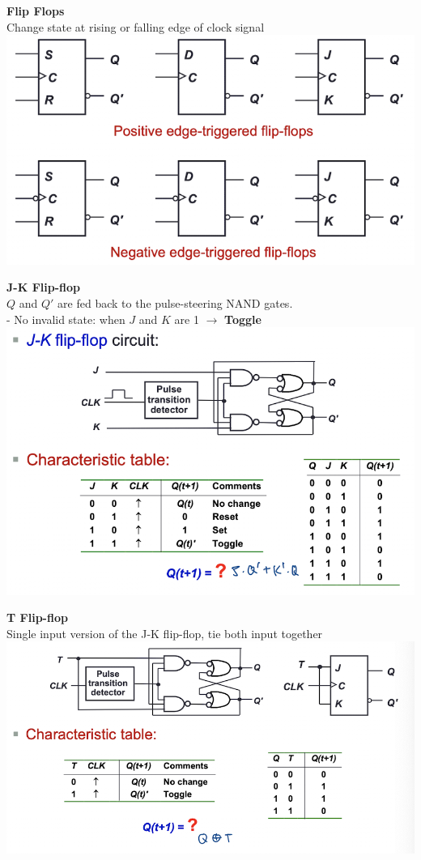 \documentclass[10pt, a4paper]{article}
\newcommand{\highlight}[1]{{\color{red}\textbf{#1}}}
\begin{document}
\begin{multicols*}{3}
		\textbf{Flip Flops}\\
		Change state at rising or falling edge of clock signal\\
		\includegraphics[scale=.5]{./assets/flipflops}
		
		\textbf{J-K Flip-flop}\\
		$Q$ and $Q'$ are fed back to the pulse-steering NAND gates.\\
		- No invalid state: when $J$ and $K$ are 1 $\rightarrow$ \highlight{Toggle}\\
		\includegraphics[scale=.5]{./assets/JKFlipFlop}
		
		\textbf{T Flip-flop}\\
		Single input version of the J-K flip-flop, tie both input together\\
		\includegraphics[scale=.5]{./assets/TFlipFlop}
		

\end{multicols*}
\end{document}
